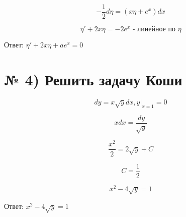 \documentclass[a4paper]{article}
\begin{document}
\begin{equation*}
-\frac{1}{2}d\eta = (x\eta + e^x)dx
\end{equation*}

\begin{equation*}
\eta' + 2x\eta = -2e^x \text{ - линейное по } \eta
\end{equation*}

Ответ: $\eta' + 2x\eta + ae^x = 0$

\section*{№ 4) Решить задачу Коши}

\begin{equation*}
dy = x\sqrt{y} dx,y|_{x=1} = 0
\end{equation*}

\begin{equation*}
xdx = \frac{dy}{\sqrt{y}}
\end{equation*}

\begin{equation*}
\frac{x^2}{2} = 2\sqrt{y} + C
\end{equation*}

\begin{equation*}
C = \frac{1}{2}
\end{equation*}

\begin{equation*}
x^2 - 4\sqrt{y} = 1
\end{equation*}

Ответ: $x^2 - 4\sqrt{y} = 1$
\end{document}
